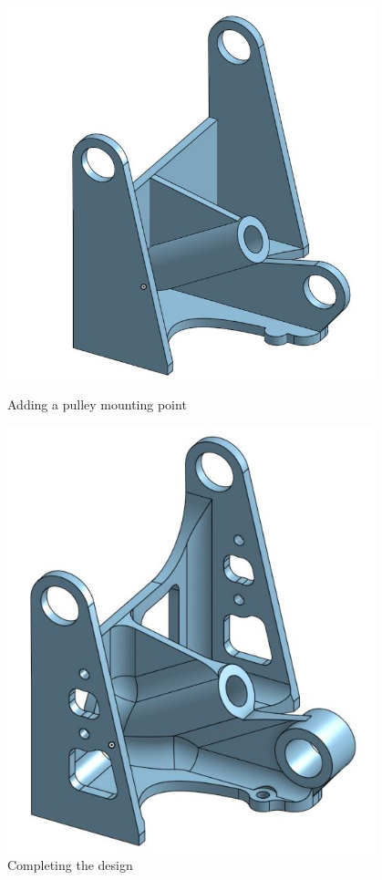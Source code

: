 \begin{figure}[ht]
\centering
\begin{minipage}[b]{.48\textwidth}
  \centering
  \includegraphics[width=0.95\textwidth]{Meetings/November/11-18-21/11-18-21_CAD_Figure3 - Nathan Forrer.JPG}
  \caption{Adding a pulley mounting point}
  \label{fig:111821_3}
\end{minipage}%
\hfill%
\begin{minipage}[b]{.48\textwidth}
  \centering
  \includegraphics[width=0.95\textwidth]{Meetings/November/11-18-21/11-18-21_CAD_Figure4 - Nathan Forrer.JPG}
  \caption{Completing the design}
  \label{fig:111821_4}
\end{minipage}
\end{figure}


